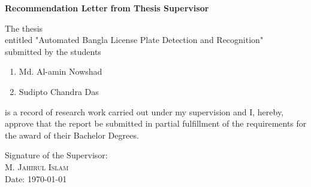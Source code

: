 \begin{center}
	\textbf{\huge Recommendation Letter from Thesis Supervisor}
\end{center}

\vspace{0.5cm}

\noindent
The thesis\\
entitled "{Automated Bangla License Plate Detection and Recognition}"\\
submitted by the students
\begin{enumerate}
	\item Md. Al-amin Nowshad
	\item Sudipto Chandra Das
\end{enumerate}
is a record of research work carried out under my supervision and I, hereby, approve that the report be submitted in partial fulfillment of the requirements for the award of their Bachelor Degrees.\\

\vspace{4.0cm}

\noindent
Signature of the Supervisor: \\
\textsc{\large M. Jahirul Islam}\\%
Date: \today